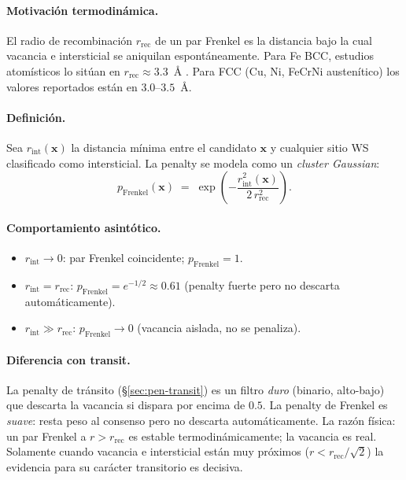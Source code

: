 \documentclass[11pt,a4paper]{article}
\theoremstyle{remark}
\begin{document}
\paragraph{Motivación termodinámica.} El radio de recombinación
$r_\text{rec}$ de un par Frenkel es la distancia bajo la cual
vacancia e intersticial se aniquilan espontáneamente. Para Fe BCC,
estudios atomísticos lo sitúan en $r_\text{rec} \approx 3.3$~Å
\cite{Bjorkas2009,Becquart2010,Stoller2000}. Para FCC (Cu, Ni, FeCrNi
austenítico) los valores reportados están en $3.0\text{--}3.5$~Å.

\paragraph{Definición.} Sea $r_\text{int}(\mathbf{x})$ la distancia
mínima entre el candidato $\mathbf{x}$ y cualquier sitio WS
clasificado como intersticial. La penalty se modela como un
\emph{cluster Gaussian}:
\begin{equation}
  p_\text{Frenkel}(\mathbf{x}) \;=\;
  \exp\!\left( -\frac{r_\text{int}^2(\mathbf{x})}{2\,r_\text{rec}^2}\right).
  \label{eq:pen-frenkel}
\end{equation}

\paragraph{Comportamiento asintótico.}
\begin{itemize}
\item $r_\text{int} \to 0$: par Frenkel coincidente; $p_\text{Frenkel} = 1$.
\item $r_\text{int} = r_\text{rec}$: $p_\text{Frenkel} = e^{-1/2} \approx 0.61$
      (penalty fuerte pero no descarta automáticamente).
\item $r_\text{int} \gg r_\text{rec}$: $p_\text{Frenkel} \to 0$
      (vacancia aislada, no se penaliza).
\end{itemize}

\paragraph{Diferencia con transit.} La penalty de tránsito (\S\ref{sec:pen-transit})
es un filtro \emph{duro} (binario, alto-bajo) que descarta la vacancia
si dispara por encima de $0.5$. La penalty de Frenkel es \emph{suave}:
resta peso al consenso pero no descarta automáticamente. La razón
física: un par Frenkel a $r > r_\text{rec}$ es estable
termodinámicamente; la vacancia es real. Solamente cuando vacancia e
intersticial están muy próximos ($r < r_\text{rec}/\sqrt{2}$) la
evidencia para su carácter transitorio es decisiva.
\end{document}
